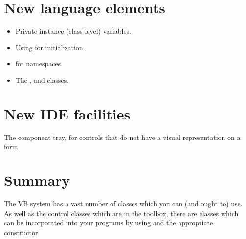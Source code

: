 	\section{New language elements}
		\begin{itemize}
			\item Private instance (class-level) variables.
			\item Using  for initialization.
			\item {} for namespaces.
			\item The ,  and  classes.
		\end{itemize}


	\section{New IDE facilities}
		The component tray, for controls that do not have a visual representation on a form.


	\section{Summary}
		The VB system has a vast number of classes which you can (and ought to) use. As well as the control classes which are in the toolbox, there are classes which can be incorporated into your programs by using  and the appropriate constructor.

